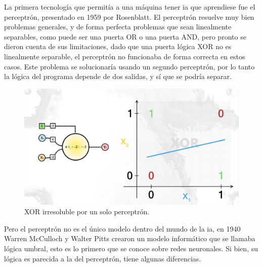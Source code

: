 La primera tecnología que permitía a una máquina tener \gls{ia} que aprendiese fue el perceptrón, presentado en 1959 por Rosenblatt. El perceptrón resuelve muy bien problemas generales, y de forma perfecta problemas que sean linealmente separables, como puede ser una puerta OR o una puerta AND, pero pronto se dieron cuenta de sus limitaciones, dado que una puerta lógica XOR no es linealmente separable, el perceptrón no funcionaba de forma correcta en estos casos. Este problema se solucionaría usando un segundo perceptrón, por lo tanto la lógica del programa depende de dos salidas, y sí que se podría separar.
\begin{figure}[h]
	\centering
	\includegraphics[width=15cm]{archivos/imagenes/problema-xor.png}
	\caption[XOR irresoluble por un solo perceptrón.]{XOR irresoluble por un solo perceptrón\footnotemark.}
	\label{XOR con un perceptron}
\end{figure}

Pero el perceptrón no es el único modelo dentro del mundo de la \gls{ia}, en 1940 Warren McCulloch y Walter Pitts crearon un modelo informático que se llamaba lógica umbral, esto es lo primero que se conoce sobre redes neuronales. Si bien, su lógica es parecida a la del perceptrón, tiene algunas diferencias. 

